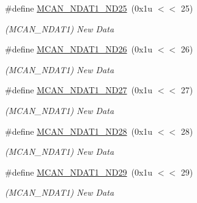 \begin{DoxyCompactItemize}
\mbox{\label{group__SAME70__MCAN_ga3810a8438a52f07fa5e642818148b221}} 
\#define \mbox{\hyperlink{group__SAME70__MCAN_ga3810a8438a52f07fa5e642818148b221}{M\+C\+A\+N\+\_\+\+N\+D\+A\+T1\+\_\+\+N\+D25}}~(0x1u $<$$<$ 25)
\begin{DoxyCompactList}\small\item\em (M\+C\+A\+N\+\_\+\+N\+D\+A\+T1) New Data \end{DoxyCompactList}\item 
\mbox{\label{group__SAME70__MCAN_gab9832d637addae2b7cb05f6603895423}} 
\#define \mbox{\hyperlink{group__SAME70__MCAN_gab9832d637addae2b7cb05f6603895423}{M\+C\+A\+N\+\_\+\+N\+D\+A\+T1\+\_\+\+N\+D26}}~(0x1u $<$$<$ 26)
\begin{DoxyCompactList}\small\item\em (M\+C\+A\+N\+\_\+\+N\+D\+A\+T1) New Data \end{DoxyCompactList}\item 
\mbox{\label{group__SAME70__MCAN_ga6d3b77a9c34e7a093684b5e1761dc249}} 
\#define \mbox{\hyperlink{group__SAME70__MCAN_ga6d3b77a9c34e7a093684b5e1761dc249}{M\+C\+A\+N\+\_\+\+N\+D\+A\+T1\+\_\+\+N\+D27}}~(0x1u $<$$<$ 27)
\begin{DoxyCompactList}\small\item\em (M\+C\+A\+N\+\_\+\+N\+D\+A\+T1) New Data \end{DoxyCompactList}\item 
\mbox{\label{group__SAME70__MCAN_gac522bca15ee0cb4ba48a195b41565876}} 
\#define \mbox{\hyperlink{group__SAME70__MCAN_gac522bca15ee0cb4ba48a195b41565876}{M\+C\+A\+N\+\_\+\+N\+D\+A\+T1\+\_\+\+N\+D28}}~(0x1u $<$$<$ 28)
\begin{DoxyCompactList}\small\item\em (M\+C\+A\+N\+\_\+\+N\+D\+A\+T1) New Data \end{DoxyCompactList}\item 
\mbox{\label{group__SAME70__MCAN_ga1763dab81942114dce9b95950a3d3f45}} 
\#define \mbox{\hyperlink{group__SAME70__MCAN_ga1763dab81942114dce9b95950a3d3f45}{M\+C\+A\+N\+\_\+\+N\+D\+A\+T1\+\_\+\+N\+D29}}~(0x1u $<$$<$ 29)
\begin{DoxyCompactList}\small\item\em (M\+C\+A\+N\+\_\+\+N\+D\+A\+T1) New Data \end{DoxyCompactList}\item 
$$
\end{DoxyCompactItemize}
